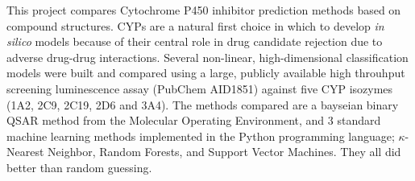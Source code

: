 This project compares Cytochrome P450 inhibitor prediction methods based on compound structures. CYPs are a natural first choice in which to  develop \textit{in silico} models because of their central role in drug candidate rejection due to adverse drug-drug interactions. Several non-linear, high-dimensional classification models were built and compared using a large, publicly available high throuhput screening luminescence assay (PubChem AID1851) against five CYP isozymes (1A2, 2C9, 2C19, 2D6 and 3A4). The methods compared are a bayseian binary QSAR method from the Molecular Operating Environment, and 3 standard machine learning methods implemented in the Python programming language; $\kappa$-Nearest Neighbor, Random Forests, and Support Vector Machines. They all did better than random guessing.